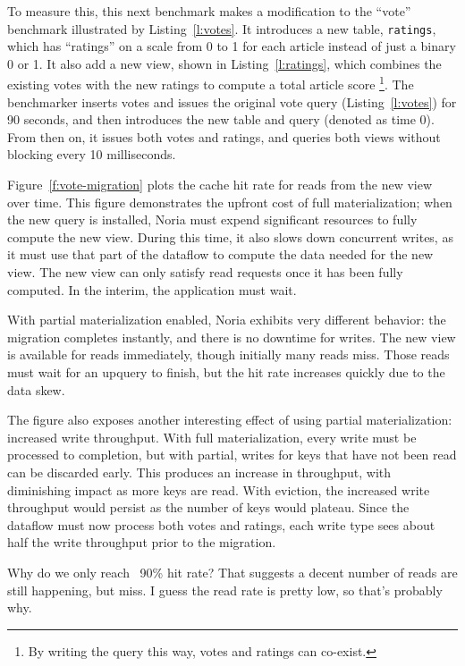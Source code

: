 To measure this, this next benchmark makes a modification to the ``vote''
benchmark illustrated by Listing~\ref{l:votes}. It introduces a new table,
\texttt{ratings}, which has ``ratings'' on a scale from 0 to 1 for each article
instead of just a binary 0 or 1. It also add a new view, shown in
Listing~\ref{l:ratings}, which combines the existing votes with the new ratings
to compute a total article score%
\footnote{By writing the query this way, votes and ratings can co-exist.}.
The benchmarker inserts votes and issues the original vote query
(Listing~\ref{l:votes}) for 90 seconds, and then introduces the new table and
query (denoted as time 0). From then on, it issues both votes and ratings, and
queries both views without blocking every 10 milliseconds.

Figure~\ref{f:vote-migration} plots the cache hit rate for reads from the new
view over time. This figure demonstrates the upfront cost of full
materialization; when the new query is installed, Noria must expend significant
resources to fully compute the new view. During this time, it also slows down
concurrent writes, as it must use that part of the dataflow to compute the data
needed for the new view. The new view can only satisfy read requests once it has
been fully computed. In the interim, the application must wait.

With partial materialization enabled, Noria exhibits very different behavior:
the migration completes instantly, and there is no downtime for writes. The new
view is available for reads immediately, though initially many reads miss. Those
reads must wait for an upquery to finish, but the hit rate increases quickly due
to the data skew.

\begin{inprogress}
The figure also exposes another interesting effect of using partial
materialization: increased write throughput. With full materialization, every
write must be processed to completion, but with partial, writes for keys that
have not been read can be discarded early. This produces an increase in
throughput, with diminishing impact as more keys are read. With eviction, the
increased write throughput would persist as the number of keys would plateau.
Since the dataflow must now process both votes and ratings, each write type sees
about half the write throughput prior to the migration.
\end{inprogress}

\begin{inprogress}
  Why do we only reach ~90\% hit rate? That suggests a decent number of reads
  are still happening, but miss. I guess the read rate is pretty low, so that's
  probably why.
\end{inprogress}

